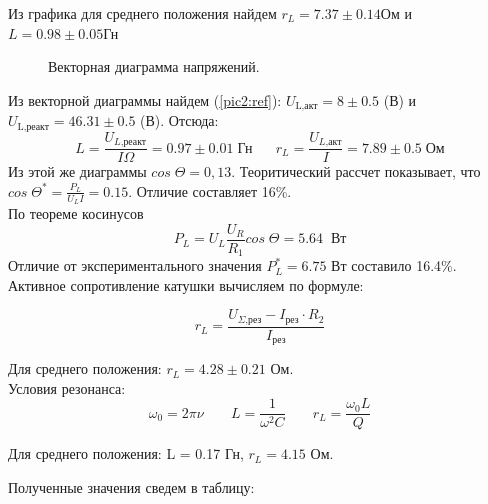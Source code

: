 \documentclass[a4paper,12pt]{article} %
\begin{document}
Из графика для среднего положения найдем $r_L = 7.37 \pm 0.14\text{Ом}$ и\\ $L = 0.98 \pm 0.05 \text{Гн}$

\begin{figure}[H]\label{vec_diog}
	\caption{Векторная диаграмма напряжений.}
\label{fig:image}
\end{figure}

Из векторной диаграммы найдем (\ref{pic2:ref}): $U_{\text{L,акт}} = 8 \pm 0.5$ (В)  и $U_{\text{L,реакт}} = 46.31 \pm 0.5$ (В). Отсюда:
$$L = \frac{U_{L\text{,реакт}}}{I\Omega} = 0.97\pm 0.01\;\text{Гн}\;\;\;\;\;\;r_L = \frac{U_{L\text{,акт}}}{I} = 7.89\pm0.5\;\text{Ом}$$
Из этой же диаграммы $cos\;\Theta = 0,13$. Теоритический рассчет показывает, что $cos\;\Theta^* = \frac{P_L}{U_L I} = 0.15$. Отличие составляет 16\%.\\

По теореме косинусов
$$P_L = U_L \frac{U_R}{R_1}cos\;\Theta = 5.64\;\;\text{Вт}$$
Отличие от экспериментального значения $P_L^* = 6.75$ Вт составило 16.4\%.\\

Активное сопротивление катушки вычисляем по формуле:

$$r_L = \frac{U_{\Sigma\text{,рез}} - I_\text{рез}\cdot R_2}{I_\text{рез}}$$

Для среднего положения: $r_L = 4.28\pm0.21$ Ом.\\

Условия резонанса: 
$$\omega_0 = 2\pi \nu \;\;\;\;\;\;\; L = \frac{1}{\omega^2 C} \;\;\;\;\;\;\; r_L = \frac{\omega_0 L}{Q}$$

Для среднего положения: L = 0.17 Гн, $r_L = 4.15$ Ом.

Полученные значения сведем в таблицу:
\end{document}

